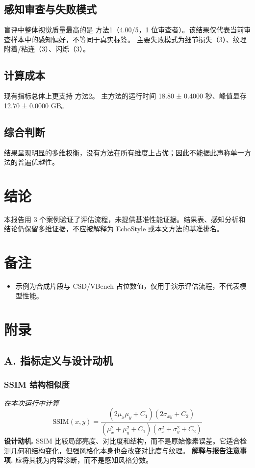 \documentclass[UTF8,10pt]{ctexart}
\begin{document}
\subsection*{感知审查与失败模式}
盲评中整体视觉质量最高的是 方法1（4.00/5，1 位审查者）。该结果仅代表当前审查样本中的感知偏好，不等同于真实标签。 主要失败模式为细节损失（3）、纹理附着/粘连（3）、闪烁（3）。
\subsection*{计算成本}
现有指标总体上更支持 方法2。 主方法的运行时间 18.80 ± 0.4000 秒、峰值显存 12.70 ± 0.0000 GB。
\subsection*{综合判断}
结果呈现明显的多维权衡，没有方法在所有维度上占优；因此不能据此声称单一方法的普遍优越性。
\section*{结论}
本报告用 3 个案例验证了评估流程，未提供基准性能证据。结果表、感知分析和结论仍保留多维证据，不应被解释为 EchoStyle 或本文方法的基准排名。
\section*{备注}
\begin{itemize}
\item 示例为合成片段与 CSD/VBench 占位数值，仅用于演示评估流程，不代表模型性能。
\end{itemize}
\clearpage
\section*{附录}
\subsection*{A. 指标定义与设计动机}
\subsubsection*{SSIM 结构相似度}
\textit{在本次运行中计算}
\begin{equation*}
\mathrm{SSIM}(x,y)=\frac{(2\mu_x\mu_y+C_1)(2\sigma_{xy}+C_2)}{(\mu_x^2+\mu_y^2+C_1)(\sigma_x^2+\sigma_y^2+C_2)}
\end{equation*}
\textbf{设计动机.} SSIM 比较局部亮度、对比度和结构，而不是原始像素误差。它适合检测几何和结构变化，但强风格化本身也会改变对比度与纹理。
\textbf{解释与报告注意事项.} 应将其视为内容诊断，而不是感知风格分数。
\end{document}
